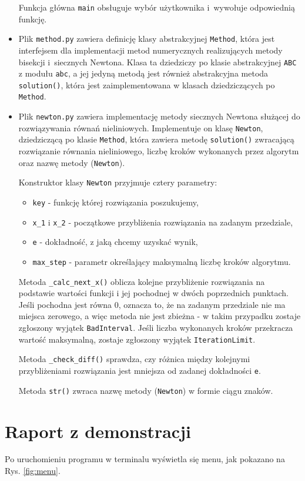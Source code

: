 \documentclass[12pt]{article}
\begin{document}
\begin{itemize}
    Funkcja główna \verb|main| obsługuje wybór użytkownika i~wywołuje odpowiednią funkcję.
    \item Plik \verb|method.py| zawiera definicję klasy abstrakcyjnej \verb|Method|, która jest interfejsem dla implementacji metod numerycznych realizujących metody bisekcji i~siecznych Newtona. Klasa ta dziedziczy po klasie abstrakcyjnej \verb|ABC| z modułu \verb|abc|, a jej jedyną metodą jest również abstrakcyjna metoda \verb|solution()|, która jest zaimplementowana w klasach dziedziczących po \verb|Method|.
    \item Plik \verb|newton.py| zawiera implementację metody siecznych Newtona służącej do rozwiązywania równań nieliniowych. Implementuje on klasę \verb|Newton|, dziedziczącą po klasie \verb|Method|, która zawiera metodę \verb|solution()| zwracającą rozwiązanie równania nieliniowego, liczbę kroków wykonanych przez algorytm oraz nazwę metody (\verb|Newton|).

Konstruktor klasy \verb|Newton| przyjmuje cztery parametry:

\begin{itemize}
\item \verb|key| - funkcję której rozwiązania poszukujemy,
\item \verb|x_1| i \verb|x_2| - początkowe przybliżenia rozwiązania na zadanym przedziale,
\item \verb|e| - dokładność, z jaką chcemy uzyskać wynik,
\item \verb|max_step| - parametr określający maksymalną liczbę kroków algorytmu.
\end{itemize}

Metoda \verb|_calc_next_x()| oblicza kolejne przybliżenie rozwiązania na podstawie wartości funkcji i jej pochodnej w dwóch poprzednich punktach. Jeśli pochodna jest równa 0, oznacza to, że na zadanym przedziale nie ma miejsca zerowego, a więc metoda nie jest zbieżna - w takim przypadku zostaje zgłoszony wyjątek \verb|BadInterval|. Jeśli liczba wykonanych kroków przekracza wartość maksymalną, zostaje zgłoszony wyjątek \verb|IterationLimit|.

Metoda \verb|_check_diff()| sprawdza, czy różnica między kolejnymi przybliżeniami rozwiązania jest mniejsza od zadanej dokładności \verb|e|.

Metoda \verb|str()| zwraca nazwę metody (\verb|Newton|) w formie ciągu znaków.
\end{itemize}
\newpage
\section{Raport z demonstracji}
\label{sec:raport}
Po uruchomieniu programu w terminalu wyświetla się menu, jak pokazano na Rys. \ref{fig:menu}.
\end{document}

